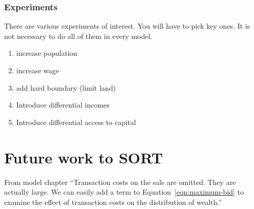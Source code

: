 \subsection{Experiments}
There are various experiments of interest. You will have to pick key ones. It is not necessary to do all of them in every model. 

	\begin{enumerate}
		\item increase population
		\item increase wage
		\item add hard boundary (limit land)
		\item Introduce differential incomes
		\item Introduce differential access to capital
	\end{enumerate}



\chapter{Future work to SORT}


From model chapter ``Transaction costs on the sale are omitted. They are actually large. We can easily add a term to  Equation~\ref{eqn:maximum-bid} to examine the effect of transaction costs on the distribution of wealth.''

